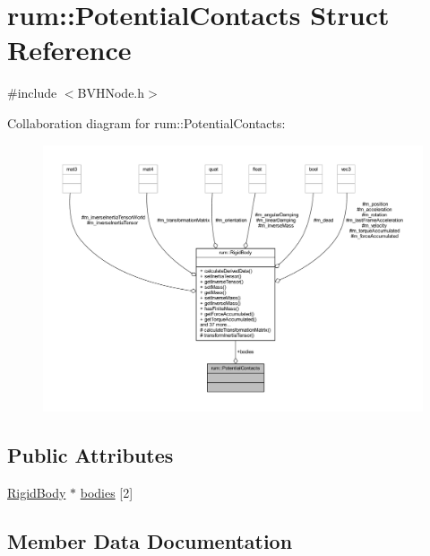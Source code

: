 \hypertarget{structrum_1_1_potential_contacts}{}\section{rum\+:\+:Potential\+Contacts Struct Reference}
\label{structrum_1_1_potential_contacts}


{\ttfamily \#include $<$B\+V\+H\+Node.\+h$>$}



Collaboration diagram for rum\+:\+:Potential\+Contacts\+:\nopagebreak
\begin{figure}[H]
\begin{center}
\leavevmode
\includegraphics[width=350pt]{structrum_1_1_potential_contacts__coll__graph}
\end{center}
\end{figure}
\subsection*{Public Attributes}
\begin{DoxyCompactItemize}
\item 
\hyperlink{classrum_1_1_rigid_body}{Rigid\+Body} $\ast$ \hyperlink{structrum_1_1_potential_contacts_aafcf13b8f1f9525413bb919a8ad2c82f}{bodies} \mbox{[}2\mbox{]}
\end{DoxyCompactItemize}


\subsection{Member Data Documentation}
\mbox{\label{structrum_1_1_potential_contacts_aafcf13b8f1f9525413bb919a8ad2c82f}} 
